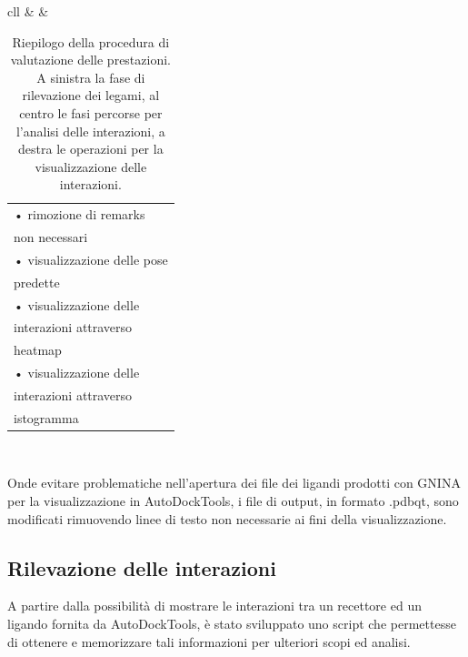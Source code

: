 \begin{table}[H]
{\begin{tabular}{cll}
 &  & \begin{tabular}[c]{@{}l@{}}• rimozione di remarks\\non necessari \\ • visualizzazione delle pose\\ predette\\ • visualizzazione delle\\ interazioni attraverso\\ heatmap\\ • visualizzazione delle\\ interazioni attraverso\\ istogramma\end{tabular} \\ \bottomrule
\end{tabular}%
}
\caption[Riepilogo della procedura di valutazione.]{Riepilogo della procedura di valutazione delle prestazioni. A sinistra la fase di rilevazione dei legami, al centro le fasi percorse per l'analisi delle interazioni, a destra le operazioni per la visualizzazione delle interazioni. }
\label{evaluation_table}
\end{table}

Onde evitare problematiche nell'apertura dei file dei ligandi prodotti con GNINA per la visualizzazione in AutoDockTools, i file di output, in formato .pdbqt, sono modificati rimuovendo linee di testo non necessarie ai fini della visualizzazione.

\subsection{Rilevazione delle interazioni}
A partire dalla possibilità di mostrare le interazioni tra un recettore ed un ligando fornita da AutoDockTools, è stato sviluppato uno script che permettesse di ottenere e memorizzare tali informazioni per ulteriori scopi ed analisi.


